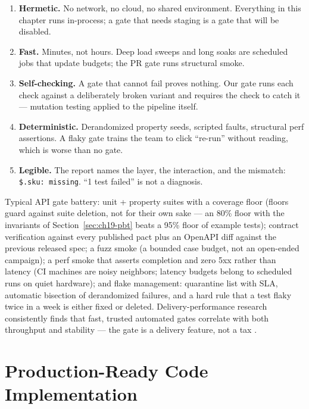 \begin{enumerate}
  \item \textbf{Hermetic.} No network, no cloud, no shared environment.
        Everything in this chapter runs in-process; a gate that needs
        staging is a gate that will be disabled.
  \item \textbf{Fast.} Minutes, not hours. Deep load sweeps and long soaks
        are scheduled jobs that update budgets; the PR gate runs structural
        smoke.
  \item \textbf{Self-checking.} A gate that cannot fail proves nothing.
        Our gate runs each check against a deliberately broken variant and
        requires the check to catch it --- mutation testing applied to the
        pipeline itself.
  \item \textbf{Deterministic.} Derandomized property seeds, scripted
        faults, structural perf assertions. A flaky gate trains the team to
        click ``re-run'' without reading, which is worse than no gate.
  \item \textbf{Legible.} The report names the layer, the interaction, and
        the mismatch: \texttt{\$.sku: missing}. ``1 test failed'' is not a
        diagnosis.
\end{enumerate}

Typical API gate battery: unit + property suites with a coverage floor
(floors guard against suite deletion, not for their own sake --- an
80\% floor with the invariants of Section~\ref{sec:ch19-pbt} beats a 95\%
floor of example tests); contract verification against every published
pact plus an OpenAPI diff against the previous released spec; a fuzz smoke
(a bounded case budget, not an open-ended campaign); a perf smoke that
asserts completion and zero 5xx rather than latency (CI machines are noisy
neighbors; latency budgets belong to scheduled runs on quiet hardware);
and flake management: quarantine list with SLA, automatic bisection of
derandomized failures, and a hard rule that a test flaky twice in a week is
either fixed or deleted. Delivery-performance research consistently finds
that fast, trusted automated gates correlate with both throughput and
stability --- the gate is a delivery feature, not a tax
\cite{beyer2016sre}.

\section{Production-Ready Code Implementation}
\label{sec:ch19-code}

